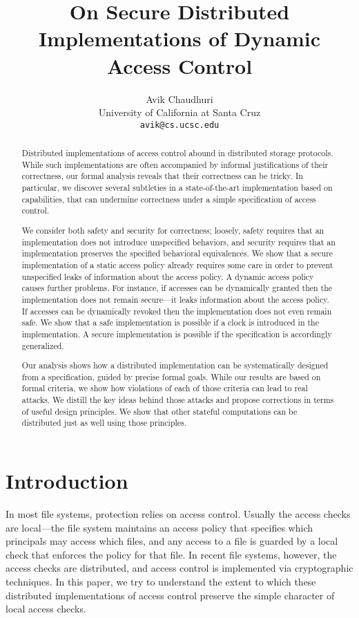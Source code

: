 \documentclass[10pt]{article}
\title{On Secure Distributed Implementations of Dynamic Access Control}
\author{Avik Chaudhuri \\ {\normalsize University of California at Santa Cruz} \\ {\normalsize \tt avik@cs.ucsc.edu}}
\date{}
\begin{document}
\maketitle

\begin{abstract} 
\noindent
Distributed implementations of access control abound in distributed storage protocols. While such implementations are often accompanied by informal justifications of their correctness, our formal analysis reveals that their correctness can be tricky. In particular, we discover several subtleties in a state-of-the-art implementation based on capabilities, that can undermine correctness under a simple specification of access control. 

We consider both safety and security for correctness; loosely, safety requires that an implementation does not introduce unspecified behaviors, and security requires that an implementation preserves the specified behavioral equivalences. 
We show that a secure implementation of a static access policy already requires some care in order to prevent unspecified leaks of information about the access policy. 
A dynamic access policy causes further problems. For instance, if accesses can be dynamically granted then the implementation does not remain secure---it leaks information about the access policy. If accesses can be dynamically revoked then the implementation does not even remain safe. We show that a safe implementation is possible if a clock is introduced in the implementation. A secure implementation is possible if the specification is accordingly generalized.

Our analysis shows how a distributed implementation can be systematically designed from a specification, guided by precise formal goals. While our results are based on formal criteria, we show how violations of each of those criteria can lead to real attacks. We distill the key ideas behind those attacks and propose corrections in terms of useful design principles. We show that other stateful computations can be distributed just as well using those principles. 

\end{abstract}



\section{Introduction}
\noindent
In most file systems, protection relies on access control. Usually the access checks are local---the file system maintains an access policy that specifies which principals may access which files, and any access to a file is guarded by a local check that enforces the policy for that file. In recent file systems, however, the access checks are distributed, and access control is implemented via cryptographic techniques. 
In this paper, we try to understand the extent to which these distributed implementations of access control preserve the simple character of local access checks. 
\end{document}
